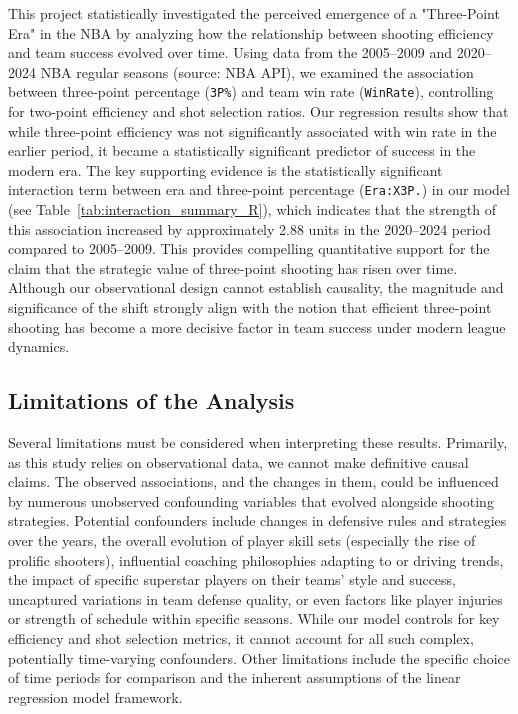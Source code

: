 \documentclass[11pt, a4paper]{article} %
\begin{document}
This project statistically investigated the perceived emergence of a "Three-Point Era" in the NBA by analyzing how the relationship 
between shooting efficiency and team success evolved over time. Using data from the 2005–2009 and 2020–2024 NBA regular seasons 
(source: NBA API), we examined the association between three-point percentage (\texttt{3P\%}) and team win rate (\texttt{WinRate}), 
controlling for two-point efficiency and shot selection ratios. Our regression results show that while three-point efficiency was 
not significantly associated with win rate in the earlier period, it became a statistically significant predictor of success in the 
modern era. The key supporting evidence is the statistically significant interaction term between era and three-point percentage 
(\texttt{Era:X3P.}) in our model (see Table~\ref{tab:interaction_summary_R}), which indicates that the strength of this association 
increased by approximately 2.88 units in the 2020–2024 period compared to 2005–2009. This provides compelling quantitative support 
for the claim that the strategic value of three-point shooting has risen over time. Although our observational design cannot 
establish causality, the magnitude and significance of the shift strongly align with the notion that efficient three-point 
shooting has become a more decisive factor in team success under modern league dynamics.

\subsection{Limitations of the Analysis} %
Several limitations must be considered when interpreting these results. Primarily, as this study relies on observational data, 
we cannot make definitive causal claims. The observed associations, and the changes in them, could be influenced by numerous 
unobserved confounding variables that evolved alongside shooting strategies. Potential confounders include changes in defensive 
rules and strategies over the years, the overall evolution of player skill sets (especially the rise of prolific shooters), 
influential coaching philosophies adapting to or driving trends, the impact of specific superstar players on their teams' style 
and success, uncaptured variations in team defense quality, or even factors like player injuries or strength of schedule within 
specific seasons. While our model controls for key efficiency and shot selection metrics, it cannot account for all such complex, 
potentially time-varying confounders. Other limitations include the specific choice of time periods for comparison and the inherent 
assumptions of the linear regression model framework.
\end{document}
